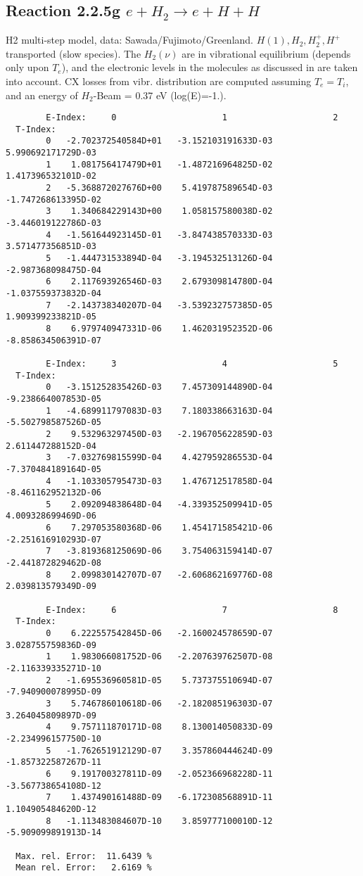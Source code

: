 \documentclass[12pt]{article}
\begin{document}
\subsection{
Reaction 2.2.5g   $e + H_2   \rightarrow e + H + H  $
}

H2 multi-step model,
data: Sawada/Fujimoto/Greenland.
$  H(1), H_2, H_2^+, H^+ $ transported (slow species).
The $H_2(\nu)$ are in vibrational equilibrium
(depends only upon $T_e$), and the electronic levels
in the molecules as discussed in \cite{kn:Sawada} are taken into
account. CX losses from vibr. distribution are computed assuming $T_e =
T_i$, and an energy of $H_2$-Beam  = 0.37 eV (log(E)=-1.).
\begin{small}\begin{verbatim}
        E-Index:     0                     1                     2
  T-Index:
        0   -2.702372540584D+01   -3.152103191633D-03    5.990692171729D-03
        1    1.081756417479D+01   -1.487216964825D-02    1.417396532101D-02
        2   -5.368872027676D+00    5.419787589654D-03   -1.747268613395D-02
        3    1.340684229143D+00    1.058157580038D-02   -3.446019122786D-03
        4   -1.561644923145D-01   -3.847438570333D-03    3.571477356851D-03
        5   -1.444731533894D-04   -3.194532513126D-04   -2.987368098475D-04
        6    2.117693926546D-03    2.679309814780D-04   -1.037559373832D-04
        7   -2.143738340207D-04   -3.539232757385D-05    1.909399233821D-05
        8    6.979740947331D-06    1.462031952352D-06   -8.858634506391D-07

        E-Index:     3                     4                     5
  T-Index:
        0   -3.151252835426D-03    7.457309144890D-04   -9.238664007853D-05
        1   -4.689911797083D-03    7.180338663163D-04   -5.502798587526D-05
        2    9.532963297450D-03   -2.196705622859D-03    2.611447288152D-04
        3   -7.032769815599D-04    4.427959286553D-04   -7.370484189164D-05
        4   -1.103305795473D-03    1.476712517858D-04   -8.461162952132D-06
        5    2.092094838648D-04   -4.339352509941D-05    4.009328699469D-06
        6    7.297053580368D-06    1.454171585421D-06   -2.251616910293D-07
        7   -3.819368125069D-06    3.754063159414D-07   -2.441872829462D-08
        8    2.099830142707D-07   -2.606862169776D-08    2.039813579349D-09

        E-Index:     6                     7                     8
  T-Index:
        0    6.222557542845D-06   -2.160024578659D-07    3.028755759836D-09
        1    1.983066081752D-06   -2.207639762507D-08   -2.116339335271D-10
        2   -1.695536960581D-05    5.737375510694D-07   -7.940900078995D-09
        3    5.746786010618D-06   -2.182085196303D-07    3.264045809897D-09
        4    9.757111870171D-08    8.130014050833D-09   -2.234996157750D-10
        5   -1.762651912129D-07    3.357860444624D-09   -1.857322587267D-11
        6    9.191700327811D-09   -2.052366968228D-11   -3.567738654108D-12
        7    1.437490161488D-09   -6.172308568891D-11    1.104905484620D-12
        8   -1.113483084607D-10    3.859777100010D-12   -5.909099891913D-14

  Max. rel. Error:  11.6439 %
  Mean rel. Error:   2.6169 %
\end{verbatim}\end{small}
\end{document}
